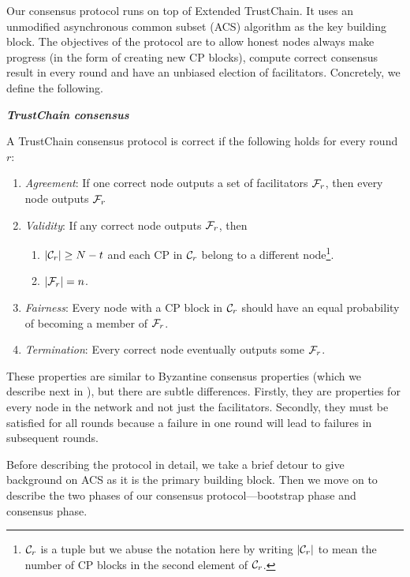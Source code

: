 Our consensus protocol runs on top of Extended TrustChain.
It uses an unmodified asynchronous common subset (ACS) algorithm as the key building block.
The objectives of the protocol are to
    allow honest nodes always make progress (in the form of creating new CP blocks),
    compute correct consensus result in every round
    and have an unbiased election of facilitators.
Concretely, we define the following.
\begin{definition}
\label{def:consensus}
\textbf{\emph{TrustChain consensus}}

A TrustChain consensus protocol is correct if the following holds for every round $r$:
\begin{enumerate}
    \item \emph{Agreement}:
        If one correct node outputs a set of facilitators $\mathcal{F}_r$,
        then every node outputs $\mathcal{F}_r$
    \item \emph{Validity}:
        If any correct node outputs $\mathcal{F}_r$, then 
            \begin{enumerate}
                \item $|\mathcal{C}_r| \ge N - t$ and each CP in $\mathcal{C}_r$ belong to a different node\footnote{
                $\mathcal{C}_r$ is a tuple but we abuse the notation here by writing $|\mathcal{C}_r|$ to mean the number of CP blocks in the second element of $\mathcal{C}_r$.}.
                \item $|\mathcal{F}_r| = n$.
            \end{enumerate}
    \item \emph{Fairness}:
        Every node with a CP block in $\mathcal{C}_r$ should have an equal probability of becoming a member of $\mathcal{F}_r$.
    \item \emph{Termination}:
        Every correct node eventually outputs some $\mathcal{F}_r$.
\end{enumerate}
\end{definition}
These properties are similar to Byzantine consensus properties (which we describe next in ), but there are subtle differences.
Firstly, they are properties for every node in the network and not just the facilitators.
Secondly, they must be satisfied for all rounds because a failure in one round will lead to failures in subsequent rounds.

Before describing the protocol in detail,
we take a brief detour to give background on ACS as it is the primary building block.
Then we move on to describe the two phases of our consensus protocol---bootstrap phase and consensus phase.

